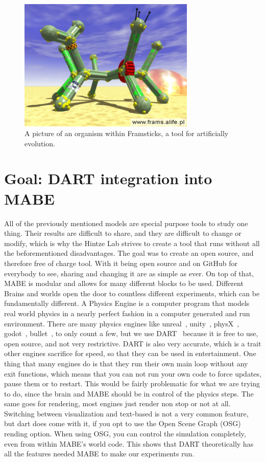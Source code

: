 \documentclass[12pt,oneside,listof=totoc,paper=a4,headings=small]{scrbook}
\begin{document}
\begin{figure}[h!]
\centering
\includegraphics[width=0.75\textwidth,height=0.75\textheight,keepaspectratio]{images/slideD1.jpg}
\caption{A picture of an organism within Framsticks, a tool for artificially evolution.~\cite{frampic}}
\label{fig:Framsticks}
\end{figure}


\section{Goal: DART integration into MABE}
All of the previously mentioned models are special purpose tools to study one thing. Their results are difficult to share, and they are difficult to change or modify, which is why the Hintze Lab strives to create a tool that runs without all the beforementioned disadvantages. The goal was to create an open source, and therefore free of charge tool. With it being open source and on GitHub for everybody to see, sharing and changing it are as simple as ever. On top of that, MABE is modular and allows for many different blocks to be used. Different Brains and worlds open the door to countless different experiments, which can be fundamentally different.
\newpage
A Physics Engine is a computer program that models real world physics in a nearly perfect fashion in a computer generated and run environment. 
There are many physics engines like unreal~\cite{unrealengine}, unity~\cite{unityengine}, physX~\cite{physxengine}, godot~\cite{linietsky2007godot}, bullet~\cite{coumans2013bullet}, to only count a few, but we use DART~\cite{lee2018dart} because it is free to use, open source, and not very restrictive. DART is also very accurate, which is a trait other engines sacrifice for speed, so that they can be used in entertainment. One thing that many engines do is that they run their own main loop without any exit functions, which means that you can not run your own code to force updates,  pause them or to restart. This would be fairly problematic for what we are trying to do, since the brain and MABE should be in control of the physics steps. The same goes for rendering, most engines just render non stop or not at all. Switching between visualization and text-based is not a very common feature, but dart does come with it, if you opt to use the Open Scene Graph (OSG) rending option. When using OSG, you can control the simulation completely, even from within MABE's world code. 
This shows that DART theoretically has all the features needed MABE to make our experiments run.
\end{document}
